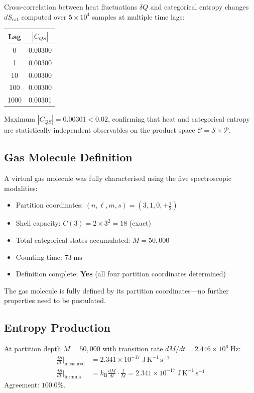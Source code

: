 \documentclass[twocolumn,10pt,a4paper]{article}
\theoremstyle{plain}
\theoremstyle{definition}
\theoremstyle{remark}
\newcommand{\kB}{k_{\mathrm{B}}}
\newcommand{\Partition}{\mathcal{P}}
\newcommand{\Cat}{\mathcal{C}}
\newcommand{\Sspace}{\mathcal{S}}
\begin{document}
Cross-correlation between heat fluctuations $\delta Q$ and categorical entropy changes $dS_{\mathrm{cat}}$ computed over $5 \times 10^4$ samples at multiple time lags:

\begin{center}
\begin{tabular}{cc}
\toprule
Lag & $|C_{QS}|$ \\
\midrule
0 & 0.00300 \\
1 & 0.00300 \\
10 & 0.00300 \\
100 & 0.00300 \\
1000 & 0.00301 \\
\bottomrule
\end{tabular}
\end{center}

Maximum $|C_{QS}| = 0.00301 < 0.02$, confirming that heat and categorical entropy are statistically independent observables on the product space $\Cat = \Sspace \times \Partition$.

\subsection{Gas Molecule Definition}

A virtual gas molecule was fully characterised using the five spectroscopic modalities:
\begin{itemize}
    \item Partition coordinates: $(n, \ell, m, s) = (3, 1, 0, +\tfrac{1}{2})$
    \item Shell capacity: $C(3) = 2 \times 3^2 = 18$ (exact)
    \item Total categorical states accumulated: $M = 50{,}000$
    \item Counting time: $73\;\mathrm{ms}$
    \item Definition complete: \textbf{Yes} (all four partition coordinates determined)
\end{itemize}

The gas molecule is fully defined by its partition coordinates---no further properties need to be postulated.

\subsection{Entropy Production}

At partition depth $M = 50{,}000$ with transition rate $dM/dt = 2.446 \times 10^6\;\mathrm{Hz}$:
\begin{align}
    \frac{dS}{dt}\bigg|_{\mathrm{measured}} &= 2.341 \times 10^{-17}\;\mathrm{J\,K^{-1}\,s^{-1}} \\
    \frac{dS}{dt}\bigg|_{\mathrm{formula}} &= \kB \frac{dM}{dt} \cdot \frac{1}{M} = 2.341 \times 10^{-17}\;\mathrm{J\,K^{-1}\,s^{-1}}
\end{align}
Agreement: $100.0\%$.
\end{document}
